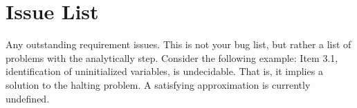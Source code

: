 \section{Issue List}
 Any outstanding requirement issues.  This is not your bug list, but rather a
 list of problems with the analytically step.  Consider the following example:
 Item 3.1, identification of uninitialized variables, is undecidable.  That is,
 it implies a solution to the halting problem.  A satisfying approximation is
 currently undefined.

